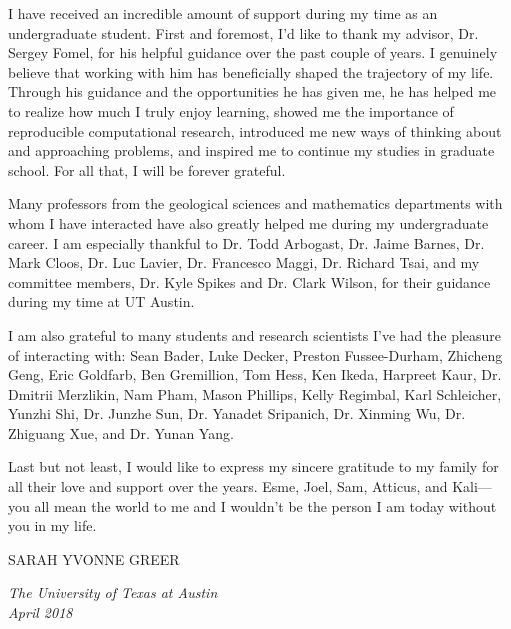 I have received an incredible amount of support during my time as an undergraduate student. 
First and foremost, I'd like to thank my advisor, Dr. Sergey Fomel, for his helpful guidance over the past couple of years. 
I genuinely believe that working with him has beneficially shaped the trajectory of my life.
Through his guidance and the opportunities he has given me, he has helped me to realize how much I truly enjoy learning, showed me the importance of reproducible computational research, introduced me new ways of thinking about and approaching problems, and inspired me to continue my studies in graduate school.
For all that, I will be forever grateful.

Many professors from the geological sciences and mathematics departments with whom I have interacted have also greatly helped me during my undergraduate career.  
I am especially thankful to Dr. Todd Arbogast, Dr. Jaime Barnes, Dr. Mark Cloos, Dr. Luc Lavier, Dr. Francesco Maggi, Dr. Richard Tsai, and my committee members, Dr. Kyle Spikes and Dr. Clark Wilson, for their guidance during my time at UT Austin.

I am also grateful to many students and research scientists I've had the pleasure of interacting with: 
Sean Bader, Luke Decker, Preston Fussee-Durham, Zhicheng Geng, Eric Goldfarb, Ben Gremillion, Tom Hess, Ken Ikeda, Harpreet Kaur, Dr. Dmitrii Merzlikin, Nam Pham, Mason Phillips, Kelly Regimbal, Karl Schleicher, Yunzhi Shi, Dr. Junzhe Sun, Dr. Yanadet Sripanich, Dr. Xinming Wu, Dr. Zhiguang Xue, and Dr. Yunan Yang. 

Last but not least, I would like to express my sincere gratitude to my family for all their love and support over the years.
Esme, Joel, Sam, Atticus, and Kali---you all mean the world to me and I wouldn't be the person I am today without you in my life.
\begin{flushright}
SARAH YVONNE GREER
\end{flushright}

\noindent \emph{The University of Texas at Austin}\\
\noindent \emph{April 2018} \\ \\

